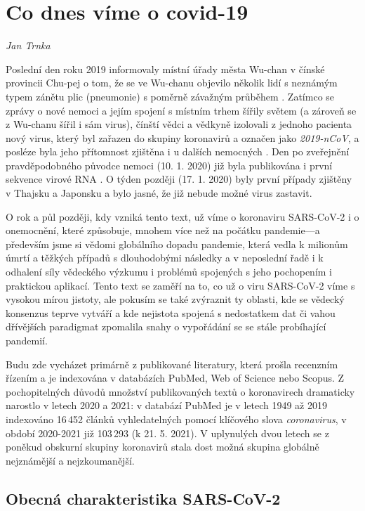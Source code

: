 \chapter{Co dnes víme o covid-19} \label{Co_se_vi}

\textit{Jan Trnka}
\vspace{15mm}

Poslední den roku 2019 informovaly místní úřady města Wu-chan v čínské provincii Chu-pej o tom, že se ve Wu-chanu objevilo několik lidí s neznámým typem zánětu plic (pneumonie) s poměrně závažným průběhem \cite{Gralinski:2020}. Zatímco se zprávy o nové nemoci a jejím spojení s místním trhem šířily světem (a zároveň se z Wu-chanu šířil i sám virus), čínští vědci a vědkyně izolovali z jednoho pacienta nový virus, který byl zařazen do skupiny koronavirů a označen jako \textit{2019-nCoV}, a posléze byla jeho přítomnost zjištěna i u dalších nemocných \cite{WHO:2020a}. Den po zveřejnění pravděpodobného původce nemoci (10. 1. 2020) již byla publikována i první sekvence virové RNA \cite{Zhang:2020a}. O týden později (17. 1. 2020) byly první případy zjištěny v Thajsku a Japonsku a bylo jasné, že již nebude možné virus zastavit.

O rok a půl později, kdy vzniká tento text, už víme o koronaviru SARS-CoV-2 i o onemocnění, které způsobuje, mnohem více než na počátku pandemie---a především jsme si vědomi globálního dopadu pandemie, která vedla k milionům úmrtí a těžkých případů s dlouhodobými následky a v neposlední řadě i k odhalení síly vědeckého výzkumu i problémů spojených s jeho pochopením i praktickou aplikací. Tento text se zaměří na to, co už o viru SARS-CoV-2 víme s vysokou mírou jistoty, ale pokusím se také zvýraznit ty oblasti, kde se vědecký konsenzus teprve vytváří a kde nejistota spojená s nedostatkem dat či vahou dřívějších paradigmat zpomalila snahy o vypořádání se se stále probíhající pandemií.

Budu zde vycházet primárně z publikované literatury, která prošla recenzním řízením a je indexována v databázích PubMed, Web of Science nebo Scopus. Z pochopitelných důvodů množství publikovaných textů o koronavirech dramaticky narostlo v letech 2020 a 2021: v databází PubMed je v letech 1949 až 2019 indexováno 16\,452 článků vyhledatelných pomocí klíčového slova \textit{coronavirus}, v období 2020-2021 již 103\,293 (k 21. 5. 2021). V uplynulých dvou letech se z poněkud obskurní skupiny koronavirů stala dost možná skupina globálně nejznámější a nejzkoumanější.

\section*{Obecná charakteristika SARS-CoV-2}

